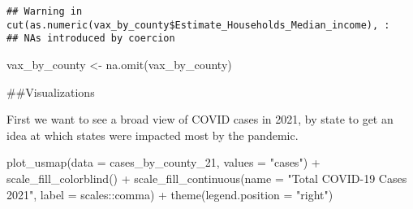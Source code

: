 \documentclass[
]{article}
\newenvironment{Shaded}{\begin{snugshade}}{\end{snugshade}}
\newcommand{\AttributeTok}[1]{\textcolor[rgb]{0.77,0.63,0.00}{#1}}
\newcommand{\DecValTok}[1]{\textcolor[rgb]{0.00,0.00,0.81}{#1}}
\newcommand{\FunctionTok}[1]{\textcolor[rgb]{0.00,0.00,0.00}{#1}}
\newcommand{\NormalTok}[1]{#1}
\newcommand{\OtherTok}[1]{\textcolor[rgb]{0.56,0.35,0.01}{#1}}
\newcommand{\SpecialCharTok}[1]{\textcolor[rgb]{0.00,0.00,0.00}{#1}}
\newcommand{\StringTok}[1]{\textcolor[rgb]{0.31,0.60,0.02}{#1}}
\begin{document}
\begin{Shaded}
\end{Shaded}

\begin{verbatim}
## Warning in cut(as.numeric(vax_by_county$Estimate_Households_Median_income), :
## NAs introduced by coercion
\end{verbatim}

\begin{Shaded}
\begin{Highlighting}[]
\NormalTok{vax\_by\_county }\OtherTok{\textless{}{-}} \FunctionTok{na.omit}\NormalTok{(vax\_by\_county)}
\end{Highlighting}
\end{Shaded}

\#\#Visualizations

First we want to see a broad view of COVID cases in 2021, by state to
get an idea at which states were impacted most by the pandemic.

\begin{Shaded}
\begin{Highlighting}[]
\FunctionTok{plot\_usmap}\NormalTok{(}\AttributeTok{data =}\NormalTok{ cases\_by\_county\_21, }\AttributeTok{values =} \StringTok{"cases"}\NormalTok{) }\SpecialCharTok{+}
  \FunctionTok{scale\_fill\_colorblind}\NormalTok{() }\SpecialCharTok{+}
  \FunctionTok{scale\_fill\_continuous}\NormalTok{(}\AttributeTok{name =} \StringTok{"Total COVID{-}19 Cases 2021"}\NormalTok{, }\AttributeTok{label =}\NormalTok{ scales}\SpecialCharTok{::}\NormalTok{comma) }\SpecialCharTok{+}
  \FunctionTok{theme}\NormalTok{(}\AttributeTok{legend.position =} \StringTok{"right"}\NormalTok{)}
\end{Highlighting}
\end{Shaded}
\end{document}
